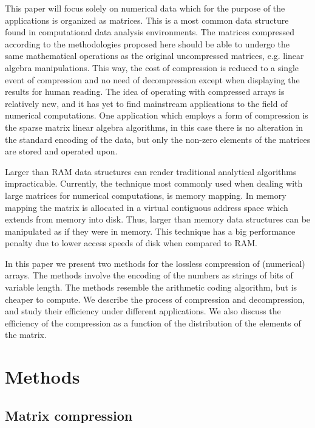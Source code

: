 \documentclass[10pt]{article}
\begin{document}
This paper will focus solely on numerical data which for the purpose of the applications is organized as   matrices. This is a most common data structure found in computational data analysis environments. The matrices compressed according to the methodologies proposed here should be able to undergo the same mathematical operations as the original uncompressed matrices, e.g. linear algebra manipulations. This way, the cost of compression is reduced to a single event of compression and no need of decompression except when displaying the results for human reading. The idea of operating with compressed arrays is relatively new\cite{yemliha2007compiler}, and it has yet to find mainstream applications to the field of numerical computations. One application which employs a form of compression is the sparse matrix linear algebra algorithms\cite{dodson1991sparse}, in this case there is no alteration in the standard encoding of the data, but only the non-zero elements of the matrices are stored and operated upon. 

Larger than RAM data structures can render traditional analytical algorithms impracticable. Currently, the technique most commonly used when dealing with large matrices for numerical computations, is memory mapping\cite{van2011numpy,big}. In memory mapping the matrix is allocated in a virtual contiguous address space which extends from memory into disk. Thus, larger than memory data structures can be manipulated as if they were in memory.  This technique has a big performance penalty due to lower access speeds of disk when compared to RAM. 

In this paper we present two methods for the lossless compression of (numerical) arrays. The methods involve the encoding of the numbers as strings of bits of variable length. The methods resemble the arithmetic coding\cite{bodden2007arithmetic} algorithm, but is cheaper to compute. We describe the process of compression and decompression, and study their efficiency under different applications. We also discuss the efficiency of the compression as a function of the distribution of the elements of the matrix. 

\section*{Methods}

\subsection*{Matrix compression}
\end{document}
